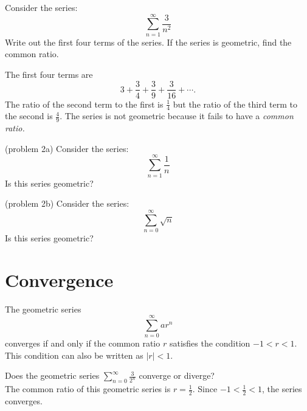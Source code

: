 \documentclass{ximera}
\begin{document}
 
 \begin{example}[example 2]
 Consider the series:
\[
 \sum_{n=1}^\infty \frac{3}{n^2} 
 \]
 Write out the first four terms of the series. If the series is geometric, find the common ratio.
 
 The first four terms are 
 \[
 3 + \frac34 + \frac39 + \frac{3}{16} + \cdots.
 \]
 The ratio of the second term to the first is $\frac14$ but the ratio of the third term to the second is $\frac49$.
 The series is not geometric because it fails to have a \it{common} ratio.
 
 \end{example}
 

 
\begin{problem}(problem 2a)
 Consider the series:
 \[
 \sum_{n=1}^\infty \frac{1}{n} 
 \]
 Is this series geometric?
 \begin{multipleChoice}
 \end{multipleChoice}
 
 \end{problem}
 

   \begin{problem}(problem 2b)
 Consider the series:
 \[
 \sum_{n=0}^\infty \sqrt n 
 \]
 Is this series geometric?
 \begin{multipleChoice}
 \end{multipleChoice}
 
 \end{problem}
 
 
\section{Convergence}

\begin{theorem} 
The geometric series
\[
\sum_{n=0}^\infty ar^n
\]
converges if and only if the common ratio $r$ satisfies the condition $-1 < r < 1$.
This condition can also be written as $|r| < 1$.
\end{theorem}

\begin{example}[example 3]
Does the geometric series $\displaystyle{\sum_{n=0}^\infty \frac{3}{2^n}}$ converge or diverge?\\
The common ratio of this geometric series is $r = \frac12$. Since $-1 < \frac 12 < 1$,
the series converges.
\end{example}
\end{document}
